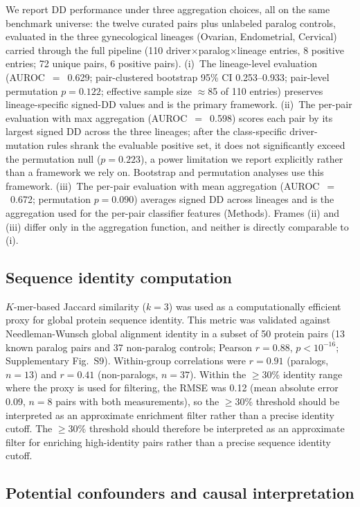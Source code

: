 \documentclass[11pt,a4paper]{article}
\begin{document}
We report DD performance under three aggregation choices, all on the same benchmark universe: the twelve curated pairs plus unlabeled paralog controls, evaluated in the three gynecological lineages (Ovarian, Endometrial, Cervical) carried through the full pipeline (110 driver$\times$paralog$\times$lineage entries, 8 positive entries; 72 unique pairs, 6 positive pairs). (i)~The lineage-level evaluation (AUROC~$=$~0.629; pair-clustered bootstrap 95\% CI 0.253--0.933; pair-level permutation $p=0.122$; effective sample size $\approx$85 of 110 entries) preserves lineage-specific signed-DD values and is the primary framework. (ii)~The per-pair evaluation with max aggregation (AUROC~$=$~0.598) scores each pair by its largest signed DD across the three lineages; after the class-specific driver-mutation rules shrank the evaluable positive set, it does not significantly exceed the permutation null ($p=0.223$), a power limitation we report explicitly rather than a framework we rely on. Bootstrap and permutation analyses use this framework. (iii)~The per-pair evaluation with mean aggregation (AUROC~$=$~0.672; permutation $p=0.090$) averages signed DD across lineages and is the aggregation used for the per-pair classifier features (Methods). Frames (ii) and (iii) differ only in the aggregation function, and neither is directly comparable to (i).


\subsection*{Sequence identity computation}

$K$-mer-based Jaccard similarity ($k=3$) was used as a computationally efficient proxy for global protein sequence identity. This metric was validated against Needleman-Wunsch global alignment identity in a subset of 50 protein pairs (13 known paralog pairs and 37 non-paralog controls; Pearson $r=0.88$, $p<10^{-16}$; Supplementary Fig.~S9). Within-group correlations were $r=0.91$ (paralogs, $n=13$) and $r=0.41$ (non-paralogs, $n=37$). Within the $\ge$30\% identity range where the proxy is used for filtering, the RMSE was 0.12 (mean absolute error 0.09, $n=8$ pairs with both measurements), so the $\ge$30\% threshold should be interpreted as an approximate enrichment filter rather than a precise identity cutoff. The $\ge$30\% threshold should therefore be interpreted as an approximate filter for enriching high-identity pairs rather than a precise sequence identity cutoff.

\subsection*{Potential confounders and causal interpretation}
\end{document}
